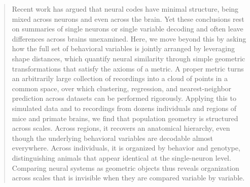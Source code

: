 \begin{abstract}
Recent work has argued that neural codes have minimal structure, being mixed across neurons and even across the brain. Yet these conclusions rest on summaries of single neurons or single variable decoding and often leave differences across brains unexamined. Here, we move beyond this by asking how the full set of behavioral variables is jointly arranged by leveraging shape distances, which quantify neural similarity through simple geometric transformations that satisfy the axioms of a metric. A proper metric turns an arbitrarily large collection of recordings into a cloud of points in a common space, over which clustering, regression, and nearest-neighbor prediction across datasets can be performed rigorously. Applying this to simulated data and to recordings from dozens individuals and  regions of mice and primate brains, we find that population geometry is structured across scales. Across regions, it recovers an anatomical hierarchy, even though the underlying behavioral variables are decodable almost everywhere. Across individuals, it is organized by behavior and  genotype, distinguishing animals that appear identical at the single-neuron level. Comparing neural systems as geometric objects thus reveals organization across scales that is invisible when they are compared variable by variable.

\end{abstract}